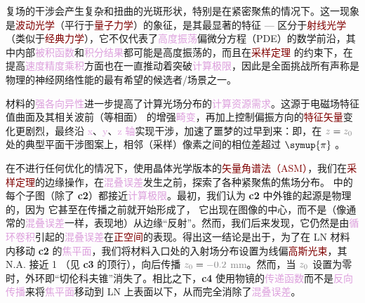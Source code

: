 复场的\textcolor{PineGreen}{干涉}会产生复杂和扭曲的光斑形状，特别是在\textcolor{PineGreen}{紧密聚焦}的情况下。这一现象是\textcolor{Maroon}{波动光学}（平行于\textcolor{Maroon}{量子力学}）的象征，是其最显著的特征 --- 区分于\textcolor{Maroon}{射线光学}（类似于\textcolor{Maroon}{经典力学}），它不仅代表了\textcolor{Plum}{高度振荡}偏微分方程（PDE）的数学前沿，其中内部\textcolor{Plum}{被积函数}和\textcolor{Plum}{积分结果}都可能是高度振荡的\cite{agocsAdaptiveSpectralMethod2024}，而且在\textcolor{Maroon}{采样定理}\cite{wangTheoryAlgorithmHomeomorphic2020} 的约束下，在提高\textcolor{Plum}{速度精度乘积}方面也在一直推动着突破\textcolor{Plum}{计算极限}，因此是全面挑战所有声称是物理的神经网络性能的最有希望的候选者/场景之一\cite{wrightDeepPhysicalNeural2022}。

材料的\textcolor{Plum}{强各向异性}进一步提高了计算光场分布的\textcolor{Plum}{计算资源需求}。这源于电磁场\textcolor{PineGreen}{特征值曲面}及其相关\textcolor{NavyBlue}{波前（等相面）} 的增强\textcolor{Plum}{畸变}，再加上控制偏振方向的\textcolor{Maroon}{特征矢量}变化更剧烈，最终沿 \textcolor{Plum}{x}、\textcolor{Plum}{y}、\textcolor{Plum}{z 轴}实现\textcolor{PineGreen}{干涉}，加速了噩梦的过早到来：即，在 $\mathcolor{gray}{z}=\mathcolor{gray}{z_0}$ 处的典型平面\textcolor{PineGreen}{干涉}图案上，相邻（采样）像素之间的\textcolor{NavyBlue}{相位差}超过 $\symup{\pi}$ \cite{leuteneggerFastFocusField2006,heintzmannScalableAngularSpectrum2023}。

在不进行任何优化的情况下，使用\textcolor{PineGreen}{晶体光学}版本的\textcolor{Maroon}{矢量角谱法（ASM）}，我们在\textcolor{Maroon}{采样定理}的边缘操作，在\textcolor{Plum}{混叠误差}发生之前，探索了各种\textcolor{PineGreen}{紧聚焦}的焦场分布。 中的每个子图（除了 \textbf{c2}）都接近\textcolor{Plum}{计算极限}。最初，我们认为 \textbf{c2} 中\textcolor{NavyBlue}{外锥}的起源是\textcolor{NavyBlue}{物理的}，因为 {\one} 它甚至在传播之前就开始形成了，{\two} 它出现在图像的中心，而不是（像通常的\textcolor{Plum}{混叠误差}一样，表现地）从边缘“\textcolor{PineGreen}{反射}”。然而，我们后来发现，它仍然是由\textcolor{Plum}{循环卷积}引起的\textcolor{Plum}{混叠误差}在\textcolor{Maroon}{正空间}的表现。得出这一结论是出于，为了在 LN 材料内移动 \textbf{c2} 的\textcolor{Plum}{焦平面}，我们将材料入口处的入射场分布设置为\textcolor{PineGreen}{线偏}\textcolor{Maroon}{高斯光束}，其 N.A. 接近 1 （见 \textbf{c3} 的顶行），向后传播 $\mathcolor{gray}{z_0}=\mathcolor{gray}{-0.2}$ \textcolor{gray}{mm}。然而，当 $\mathcolor{gray}{z_0}$ 设置为零时，\textcolor{NavyBlue}{外环}即“\textcolor{NavyBlue}{切伦科夫锥}”消失了。相比之下，\textbf{c4} 使用\textcolor{PineGreen}{物镜}的\textcolor{Plum}{传递函数}而不是\textcolor{Plum}{反向传播}来将\textcolor{Plum}{焦平面}移动到 LN 上表面以下，从而完全消除了\textcolor{Plum}{混叠误差}。


